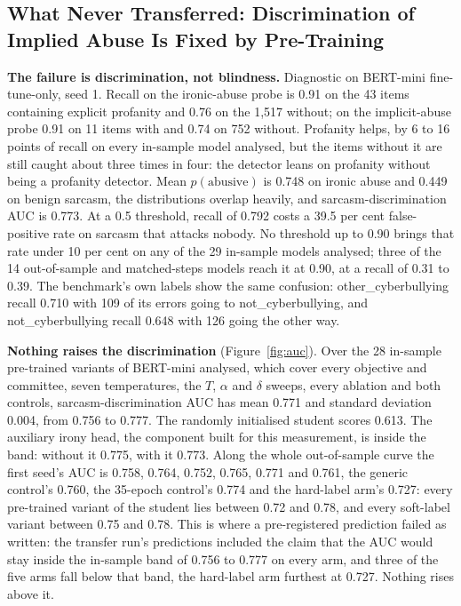 \subsection{What Never Transferred: Discrimination of Implied Abuse Is Fixed by Pre-Training}
\label{sec:5.10}
\textbf{The failure is discrimination, not blindness.} Diagnostic on BERT-mini fine-tune-only, seed
1. Recall on the ironic-abuse probe is 0.91 on the 43 items containing explicit profanity and 0.76
on the 1,517 without; on the implicit-abuse probe 0.91 on 11 items with and 0.74 on 752 without.
Profanity helps, by 6 to 16 points of recall on every in-sample model analysed, but the items
without it are still caught about three times in four: the detector leans on profanity without being
a profanity detector. Mean $p(\text{abusive})$ is 0.748 on ironic abuse and 0.449 on benign sarcasm,
the distributions overlap heavily, and sarcasm-discrimination AUC is 0.773. At a 0.5 threshold,
recall of 0.792 costs a 39.5 per cent false-positive rate on sarcasm that attacks nobody. No
threshold up to 0.90 brings that rate under 10 per cent on any of the 29 in-sample models analysed;
three of the 14 out-of-sample and matched-steps models reach it at 0.90, at a recall of 0.31 to
0.39. The benchmark's own labels show the same confusion: other\_cyberbullying recall 0.710 with 109
of its errors going to not\_cyberbullying, and not\_cyberbullying recall 0.648 with 126 going the
other way.

\textbf{Nothing raises the discrimination} (Figure~\ref{fig:auc}). Over the 28 in-sample pre-trained
variants of BERT-mini analysed, which cover every objective and committee, seven temperatures, the
$T$, $\alpha$ and $\delta$ sweeps, every ablation and both controls, sarcasm-discrimination AUC has
mean 0.771 and standard deviation 0.004, from 0.756 to 0.777. The randomly initialised student
scores 0.613. The auxiliary irony head, the component built for this measurement, is inside the
band: without it 0.775, with it 0.773. Along the whole out-of-sample curve the first seed's AUC is
0.758, 0.764, 0.752, 0.765, 0.771 and 0.761, the generic control's 0.760, the 35-epoch control's
0.774 and the hard-label arm's 0.727: every pre-trained variant of the student lies between 0.72 and
0.78, and every soft-label variant between 0.75 and 0.78. This is where a pre-registered prediction
failed as written: the transfer run's predictions included the claim that the AUC would stay inside
the in-sample band of 0.756 to 0.777 on every arm, and three of the five arms fall below that band,
the hard-label arm furthest at 0.727. Nothing rises above it.

